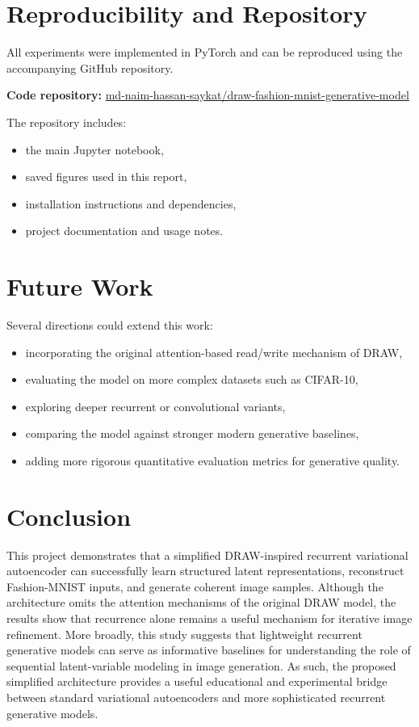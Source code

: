 \documentclass[11pt,a4paper]{article}
\begin{document}
\section{Reproducibility and Repository}
All experiments were implemented in PyTorch and can be reproduced using the accompanying GitHub repository.

\noindent\textbf{Code repository: }
\href{https://github.com/md-naim-hassan-saykat/draw-fashion-mnist-generative-model}{md-naim-hassan-saykat/draw-fashion-mnist-generative-model}

The repository includes:
\begin{itemize}
    \item the main Jupyter notebook,
    \item saved figures used in this report,
    \item installation instructions and dependencies,
    \item project documentation and usage notes.
\end{itemize}
\section{Future Work}
Several directions could extend this work:
\begin{itemize}
    \item incorporating the original attention-based read/write mechanism of DRAW,
    \item evaluating the model on more complex datasets such as CIFAR-10,
    \item exploring deeper recurrent or convolutional variants,
    \item comparing the model against stronger modern generative baselines,
    \item adding more rigorous quantitative evaluation metrics for generative quality.
\end{itemize}
\section{Conclusion}
This project demonstrates that a simplified DRAW-inspired recurrent variational autoencoder can successfully learn structured latent representations, reconstruct Fashion-MNIST inputs, and generate coherent image samples. Although the architecture omits the attention mechanisms of the original DRAW model, the results show that recurrence alone remains a useful mechanism for iterative image refinement.
More broadly, this study suggests that lightweight recurrent generative models can serve as informative baselines for understanding the role of sequential latent-variable modeling in image generation. As such, the proposed simplified architecture provides a useful educational and experimental bridge between standard variational autoencoders and more sophisticated recurrent generative models.



\end{document}
